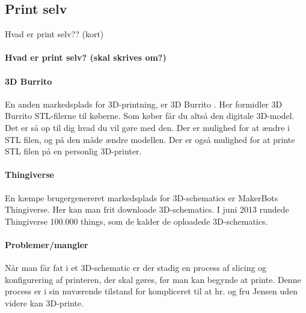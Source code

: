 \subsection{Print selv} %
\label{sub:print_selv}

Hvad er print selv?? (kort)

\paragraph{Hvad er print selv? (skal skrives om?)} %


\paragraph{3D Burrito} %
\label{par:3d_burrito}

En anden markedsplads for 3D-printning, er 3D Burrito \autocite{_3d_2013-1}. Her formidler 3D Burrito STL-filerne til køberne. Som køber får du altså den digitale 3D-model. Det er så op til dig hvad du vil gøre med den. Der er mulighed for at ændre i STL filen, og på den måde ændre modellen. Der er også mulighed for at printe STL filen på en personlig 3D-printer.


\paragraph{Thingiverse} %
\label{par:thingiverse}

En kæmpe brugergenereret markedsplads for 3D-schematics er MakerBots Thingiverse. Her kan man frit downloade 3D-schematics. I juni 2013 rundede Thingiverse 100.000 things, som de kalder de oploadede 3D-schematics. \autocite{_100000th_????}


\paragraph{Problemer/mangler} %
\label{par:problemer_mangler}

Når man får fat i et 3D-schematic er der stadig en process af slicing og konfigurering af printeren, der skal gøres, før man kan begynde at printe. Denne process er i sin nuværende tilstand for kompliceret til at hr. og fru Jensen uden videre kan 3D-printe.





